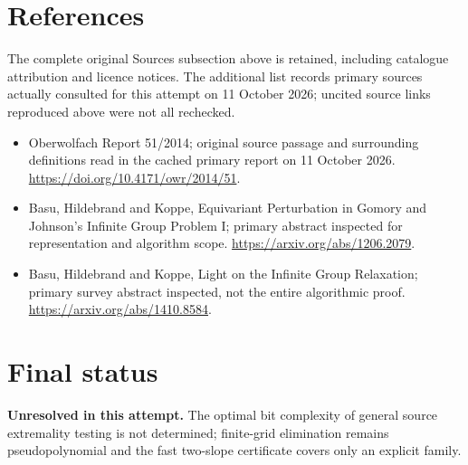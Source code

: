 \documentclass[11pt]{article}
\begin{document}
\section{References}
The complete original Sources subsection above is retained, including catalogue attribution and licence notices. The additional list records primary sources actually consulted for this attempt on 11 October 2026; uncited source links reproduced above were not all rechecked.
\begin{itemize}
\item Oberwolfach Report 51/2014; original source passage and surrounding definitions read in the cached primary report on 11 October 2026. \url{https://doi.org/10.4171/owr/2014/51}.
\item Basu, Hildebrand and Koppe, Equivariant Perturbation in Gomory and Johnson’s Infinite Group Problem I; primary abstract inspected for representation and algorithm scope. \url{https://arxiv.org/abs/1206.2079}.
\item Basu, Hildebrand and Koppe, Light on the Infinite Group Relaxation; primary survey abstract inspected, not the entire algorithmic proof. \url{https://arxiv.org/abs/1410.8584}.
\end{itemize}
\section{Final status}
\textbf{Unresolved in this attempt.} The optimal bit complexity of general source extremality testing is not determined; finite-grid elimination remains pseudopolynomial and the fast two-slope certificate covers only an explicit family.
\end{document}

